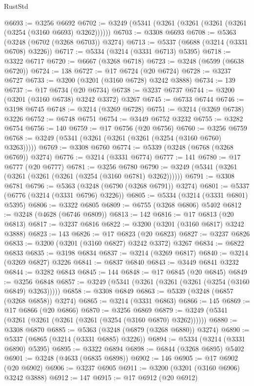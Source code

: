 \begin{lexlean}{RustStd}
\begin{coremodule}
@6693 := @3256 @6692
@6702 := @3249 (@5341 (@3261 (@3261 (@3261 (@3261 (@3254 (@3160 @6693) @3262))))))
@6703 := @3308 @6693
@6708 := @5363 (@3248 (@6702 (@3268 @6703)) @3274)
@6713 := @5337 (@6688 (@3214 (@3331 @6708) @3226))
@6717 := @5334 (@3214 (@3331 @6713) @5395)
@6718 := @3322 @6717
@6720 := @6667 (@3268 @6718)
@6723 := @3248 (@6599 (@6638 @6720))
@6724 := 138
@6727 := @17 @6724 (@20 @6724)
@6728 := @3237 @6727
@6733 := @3200 (@3201 (@3160 @6728) @3242 @3888)
@6734 := 139
@6737 := @17 @6734 (@20 @6734)
@6738 := @3237 @6737
@6744 := @3200 (@3201 (@3160 @6738) @3242 @3372) @3267
@6745 := @6733 @6744
@6746 := @3198 @6745
@6748 := @3214 (@3269 @6728)
@6751 := @3214 (@3269 @6738) @3226
@6752 := @6748 @6751
@6754 := @3449 @6752 @3232
@6755 := @3282 @6754
@6756 := 140
@6759 := @17 @6756 (@20 @6756)
@6760 := @3256 @6759
@6768 := @3249 (@5341 (@3261 (@3261 (@3261 (@3254 (@3160 @6760) @3263)))))
@6769 := @3308 @6760
@6774 := @5339 (@3248 (@6768 (@3268 @6769)) @3274)
@6776 := @3214 (@3331 @6774)
@6777 := 141
@6780 := @17 @6777 (@20 @6777)
@6781 := @3256 @6780
@6790 := @3249 (@5341 (@3261 (@3261 (@3261 (@3261 (@3254 (@3160 @6781) @3262))))))
@6791 := @3308 @6781
@6796 := @5363 (@3248 (@6790 (@3268 @6791)) @3274)
@6801 := @5337 (@6776 (@3214 (@3331 @6796) @3226))
@6805 := @5334 (@3214 (@3331 @6801) @5395)
@6806 := @3322 @6805
@6809 := @6755 (@3268 @6806) @5402
@6812 := @3248 (@4628 (@6746 @6809))
@6813 := 142
@6816 := @17 @6813 (@20 @6813)
@6817 := @3237 @6816
@6822 := @3200 (@3201 (@3160 @6817) @3242 @3888)
@6823 := 143
@6826 := @17 @6823 (@20 @6823)
@6827 := @3237 @6826
@6833 := @3200 (@3201 (@3160 @6827) @3242 @3372) @3267
@6834 := @6822 @6833
@6835 := @3198 @6834
@6837 := @3214 (@3269 @6817)
@6840 := @3214 (@3269 @6827) @3226
@6841 := @6837 @6840
@6843 := @3449 @6841 @3232
@6844 := @3282 @6843
@6845 := 144
@6848 := @17 @6845 (@20 @6845)
@6849 := @3256 @6848
@6857 := @3249 (@5341 (@3261 (@3261 (@3261 (@3254 (@3160 @6849) @3263)))))
@6858 := @3308 @6849
@6863 := @5339 (@3248 (@6857 (@3268 @6858)) @3274)
@6865 := @3214 (@3331 @6863)
@6866 := 145
@6869 := @17 @6866 (@20 @6866)
@6870 := @3256 @6869
@6879 := @3249 (@5341 (@3261 (@3261 (@3261 (@3261 (@3254 (@3160 @6870) @3262))))))
@6880 := @3308 @6870
@6885 := @5363 (@3248 (@6879 (@3268 @6880)) @3274)
@6890 := @5337 (@6865 (@3214 (@3331 @6885) @3226))
@6894 := @5334 (@3214 (@3331 @6890) @5395)
@6895 := @3322 @6894
@6898 := @6844 (@3268 @6895) @5402
@6901 := @3248 (@4633 (@6835 @6898))
@6902 := 146
@6905 := @17 @6902 (@20 @6902)
@6906 := @3237 @6905
@6911 := @3200 (@3201 (@3160 @6906) @3242 @3888)
@6912 := 147
@6915 := @17 @6912 (@20 @6912)

\end{coremodule}
\end{lexlean}
